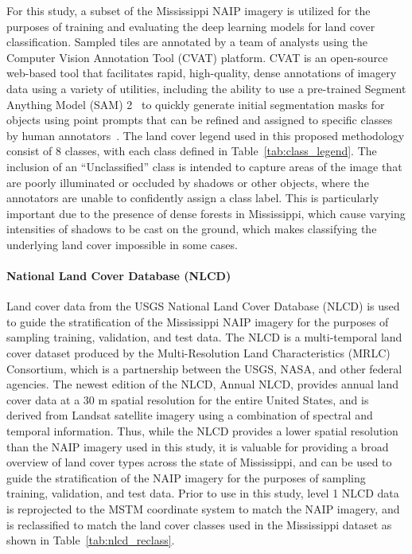 For this study, a subset of the Mississippi NAIP imagery is utilized for the purposes of training and evaluating the deep learning models for land cover classification.
Sampled tiles are annotated by a team of analysts using the Computer Vision Annotation Tool (CVAT) platform.
CVAT is an open-source web-based tool that facilitates rapid, high-quality, dense annotations of imagery data using a variety of utilities, including the ability to use a pre-trained Segment Anything Model (SAM) 2~\cite{raviSAM2Segment2024} to quickly generate initial segmentation masks for objects using point prompts that can be refined and assigned to specific classes by human annotators~\cite{cvat2023}.
The land cover legend used in this proposed methodology consist of 8 classes, with each class defined in Table~\ref{tab:class_legend}.
The inclusion of an ``Unclassified'' class is intended to capture areas of the image that are poorly illuminated or occluded by shadows or other objects, where the annotators are unable to confidently assign a class label.
This is particularly important due to the presence of dense forests in Mississippi, which cause varying intensities of shadows to be cast on the ground, which makes classifying the underlying land cover impossible in some cases.



\paragraph{National Land Cover Database (NLCD)}

Land cover data from the USGS National Land Cover Database (NLCD) is used to guide the stratification of the Mississippi NAIP imagery for the purposes of sampling training, validation, and test data.
The NLCD is a multi-temporal land cover dataset produced by the Multi-Resolution Land Characteristics (MRLC) Consortium, which is a partnership between the USGS, NASA, and other federal agencies.
The newest edition of the NLCD, Annual NLCD, provides annual land cover data at a 30 m spatial resolution for the entire United States, and is derived from Landsat satellite imagery using a combination of spectral and temporal information.
Thus, while the NLCD provides a lower spatial resolution than the NAIP imagery used in this study, it is valuable for providing a broad overview of land cover types across the state of Mississippi, and can be used to guide the stratification of the NAIP imagery for the purposes of sampling training, validation, and test data.
Prior to use in this study, level 1 NLCD data is reprojected to the MSTM coordinate system to match the NAIP imagery, and is reclassified to match the land cover classes used in the Mississippi dataset as shown in Table~\ref{tab:nlcd_reclass}.

